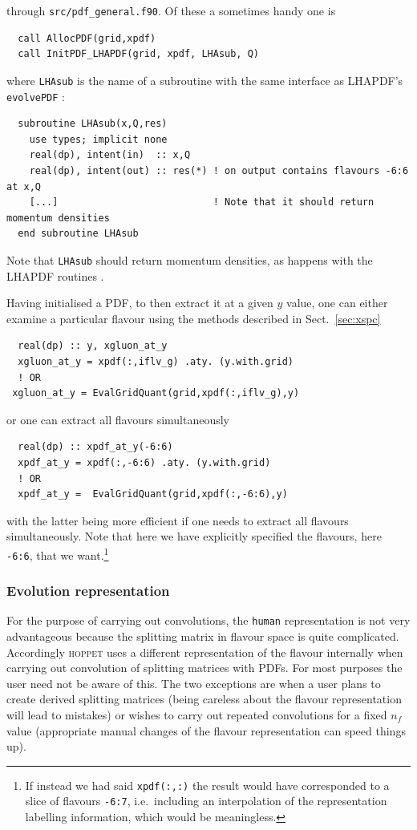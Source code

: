 \documentclass[12pt]{article}
\newcommand{\ie}{i.e.\ }
\newcommand{\hoppet}{\textsc{hoppet}\xspace}
\newcommand{\ttt}[1]{\texttt{#1}}
\begin{document}
through \ttt{src/pdf\_general.f90}. Of these a sometimes handy one is
\begin{lstlisting}
  call AllocPDF(grid,xpdf)
  call InitPDF_LHAPDF(grid, xpdf, LHAsub, Q)
\end{lstlisting}
where \texttt{LHAsub} is the name of a subroutine 
with the same interface as LHAPDF's \ttt{evolvePDF} \cite{LHAPDF}:
\begin{lstlisting}
  subroutine LHAsub(x,Q,res)
    use types; implicit none
    real(dp), intent(in)  :: x,Q
    real(dp), intent(out) :: res(*) ! on output contains flavours -6:6 at x,Q
    [...]                           ! Note that it should return momentum densities
  end subroutine LHAsub
\end{lstlisting}
Note that {\tt LHAsub} should return momentum densities, as
happens with the LHAPDF routines \cite{LHAPDF}.


Having initialised a PDF, to then extract it at a given $y$ value, one
can either examine a particular flavour using the methods described in
Sect.~\ref{sec:xspc}
\begin{lstlisting}
  real(dp) :: y, xgluon_at_y
  xgluon_at_y = xpdf(:,iflv_g) .aty. (y.with.grid)
  ! OR
 xgluon_at_y = EvalGridQuant(grid,xpdf(:,iflv_g),y) 
\end{lstlisting}
or one can extract all flavours simultaneously
\begin{lstlisting}
  real(dp) :: xpdf_at_y(-6:6)
  xpdf_at_y = xpdf(:,-6:6) .aty. (y.with.grid)
  ! OR
  xpdf_at_y =  EvalGridQuant(grid,xpdf(:,-6:6),y) 
\end{lstlisting}
with the latter being more efficient if one needs to extract all
flavours simultaneously. Note that here we have explicitly specified
the flavours, here \ttt{-6:6}, that we want.\footnote{If instead we had
  said \ttt{xpdf(:,:)} the result would have corresponded to a slice of
  flavours \ttt{-6:7}, \ie including an interpolation of the
  representation labelling information, which would be meaningless.}


\subsubsection{Evolution representation} 
\label{sec:evln-rep}
%
For the purpose of carrying out convolutions, the \ttt{human}
representation is not very advantageous because the splitting matrix
in flavour space is quite complicated. Accordingly \hoppet uses a
different representation of the flavour internally when carrying out
convolution of splitting matrices with PDFs. For most purposes the
user need not be aware of this. The two exceptions are when a user
plans to create derived splitting matrices (being careless about the
flavour representation will lead to mistakes) or wishes to carry out
repeated convolutions for a fixed $n_f$ value (appropriate manual
changes of the flavour representation can speed things up).
\end{document}
